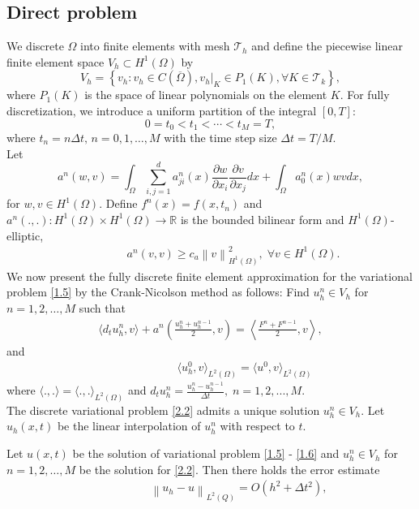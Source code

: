 \documentclass[notitlepage,a4paper,fleqn,9pt]{icmfarticle}
\begin{document}
\begin{multicols}{2}
\section{Direct problem}
We discrete $\Omega$ into finite elements with mesh $\mathcal{T}_h$ and define the piecewise linear finite element space $V_h \subset H^1(\Omega)$ by
$$V_h=\left\{v_h:v_h\in C(\overline{\Omega}), v_h|_K\in P_1(K), \forall K\in \mathcal{T}_k\right\},$$
where $P_1(K)$ is the space of linear polynomials on the element $K$. For fully discretization, we introduce a uniform partition of the integral $[0, T]:$
$$0=t_0<t_1<\cdots<t_M=T,$$ 
where $t_n=n\Delta t,\, n=0, 1, \dots, M$  with the time step size $\Delta t = T/M$.
\\
Let 
$$a^n(w, v)=\int_{\Omega}\sum_{i, j=1}^{d}a^n_{ji}(x)\frac{\partial w}{\partial x_i}\frac{\partial v}{\partial x_j}dx+\int_{\Omega}a_0^n(x)wvdx,$$
for $w, v\in H^1(\Omega)$. Define $f^n(x)=f(x, t_n)$ and $a^n(., .): H^1(\Omega)\times H^1(\Omega)\to \mathbb{R}$ is the bounded bilinear form and $H^1(\Omega)$-elliptic,
\begin{align}\label{elliptic}
	\qquad\qquad a^n(v, v)\geq c_a\left\|v\right\|_{H^1(\Omega)}^2, \; \forall v\in H^1(\Omega).
\end{align}
We now present the fully discrete finite element approximation for the variational problem \eqref{1.5} by the Crank-Nicolson method as follows: Find $u^n_h\in V_h$ for $n=1, 2, \dots, M$ such that
\begin{align}\label{2.2}
	\langle d_tu^n_h, v \rangle+a^n\left(\frac{u^n_h+u^{n-1}_h}{2}, v\right)=\left\langle \frac{F^n+F^{n-1}}{2}, v \right\rangle,
\end{align}
and
\begin{align}
	\qquad\qquad\qquad\langle u^0_h, v \rangle_{L^2(\Omega)}=\langle u^0, v \rangle_{L^2(\Omega)}
\end{align}
where $\langle.,.\rangle=\langle.,.\rangle_{L^2(\Omega)}$ and $d_tu^n_h=\frac{u^n_h-u^{n-1}_h}{\Delta t}, \; n=1, 2, ..., M.$
\\
The discrete variational problem \eqref{2.2} admits a unique solution $u^n_h\in V_h$. Let $u_h(x, t)$ be the linear interpolation of $u_h^n$ with respect to $t$. 
\begin{dl}\label{dl2.1}
	Let $u(x, t)$ be the solution of variational problem \eqref{1.5} - \eqref{1.6} and $u^n_h\in V_h$ for $n=1, 2, \dots, M$ be the solution for \eqref{2.2}. Then there holds the error estimate
	\begin{align}\label{2.4}
		\qquad\qquad\quad\left\|u_h-u\right\|_{L^2(Q)}=O\left(h^2+\Delta t^2\right),

\end{align}
\end{dl}
\end{multicols}
\end{document}
